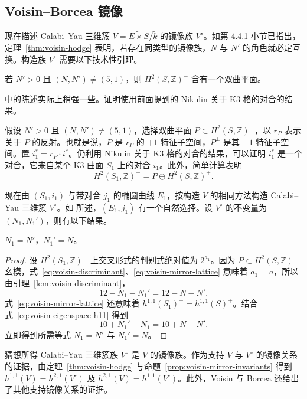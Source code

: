 \subsection{Voisin--Borcea 镜像}\label{subsec:voisin-mirror}

现在描述 Calabi--Yau 三维簇 $V=\widetilde{E\times S}/\widetilde k$ 的镜像族 $V^\circ$。如\hyperref[subsec:voisin-threefolds]{第 4.4.1 小节}已指出，定理~\ref{thm:voisin-hodge} 表明，若存在同类型的镜像族，$N$ 与 $N'$ 的角色就必定互换。构造族 $V^\circ$ 需要以下技术性引理。
\begin{lemma}\label{lem:voisin-hyperbolic-plane}
若 $N'>0$ 且 $(N,N')\ne(5,1)$，则 $H^2(S,\mathbb Z)^-$ 含有一个双曲平面。
\end{lemma}
 中的陈述实际上稍强一些。证明使用前面提到的 Nikulin 关于 K3 格的对合的结果。

假设 $N'>0$ 且 $(N,N')\ne(5,1)$，选择双曲平面 $P\subset H^2(S,\mathbb Z)^-$，以 $r_P$ 表示关于 $P$ 的反射。也就是说，$P$ 是 $r_P$ 的 $+1$ 特征子空间，$P^\perp$ 是其 $-1$ 特征子空间。置 $i_1^*=r_P\cdot i^*$。仍利用 Nikulin 关于 K3 格的对合的结果，可以证明 $i_1^*$ 是一个对合，它来自某个 K3 曲面 $S_1$ 上的对合 $i_1$。此外，简单计算表明
\begin{equation}\label{eq:voisin-mirror-lattice}
H^2(S_1,\mathbb Z)^-=P\oplus H^2(S,\mathbb Z)^+.
\end{equation}

现在由 $(S_1,i_1)$ 与带对合 $j_1$ 的椭圆曲线 $E_1$，按构造 $V$ 的相同方法构造 Calabi--Yau 三维簇 $V^\circ$。如  所述，$(E_1,j_1)$ 有一个自然选择。设 $V^\circ$ 的不变量为 $(N_1,N_1')$，则有以下结果。
\begin{proposition}\label{prop:voisin-mirror-invariants}
$N_1=N'$，$N_1'=N$。
\end{proposition}
\begin{proof}
设 $H^2(S_1,\mathbb Z)^-$ 上交叉形式的判别式绝对值为 $2^{a_1}$。因为 $P\subset H^2(S,\mathbb Z)$ 幺模，式~\eqref{eq:voisin-discriminant}、\eqref{eq:voisin-mirror-lattice} 意味着 $a_1=a$，所以由引理~\ref{lem:voisin-discriminant}，
\[
12-N_1-N_1'=12-N-N'.
\]
式~\eqref{eq:voisin-mirror-lattice} 还意味着 $h^{1,1}(S_1)^-=h^{1,1}(S)^+$。结合式~\eqref{eq:voisin-eigenspace-h11} 得到
\[
10+N_1'-N_1=10+N-N'.
\]
立即得到所需等式 $N_1=N'$ 与 $N_1'=N$。
\end{proof}

猜想所得 Calabi--Yau 三维簇族 $V^\circ$ 是 $V$ 的镜像族。作为支持 $V$ 与 $V^\circ$ 的镜像关系的证据，由定理~\ref{thm:voisin-hodge} 与命题~\ref{prop:voisin-mirror-invariants} 得到 $h^{1,1}(V)=h^{2,1}(V^\circ)$ 及 $h^{2,1}(V)=h^{1,1}(V^\circ)$。此外，Voisin 与 Borcea 还给出了其他支持镜像关系的证据。

